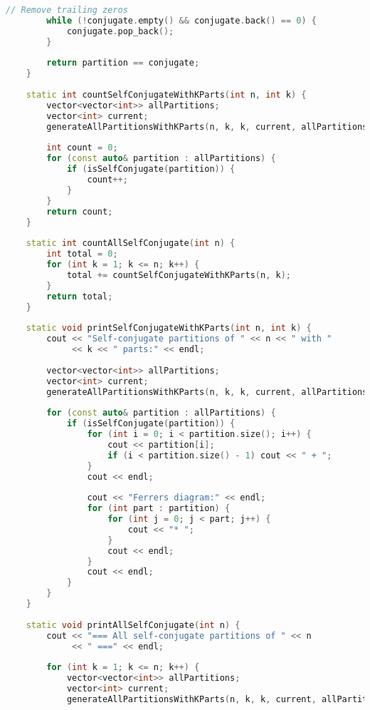 \documentclass[12pt,a4paper]{article}
\theoremstyle{definition}
\begin{document}
\begin{lstlisting}[language=C++, caption=Chương trình C++ hoàn chỉnh cho bài 2 \& 3]
        // Remove trailing zeros
        while (!conjugate.empty() && conjugate.back() == 0) {
            conjugate.pop_back();
        }
        
        return partition == conjugate;
    }
    
    static int countSelfConjugateWithKParts(int n, int k) {
        vector<vector<int>> allPartitions;
        vector<int> current;
        generateAllPartitionsWithKParts(n, k, k, current, allPartitions);
        
        int count = 0;
        for (const auto& partition : allPartitions) {
            if (isSelfConjugate(partition)) {
                count++;
            }
        }
        return count;
    }
    
    static int countAllSelfConjugate(int n) {
        int total = 0;
        for (int k = 1; k <= n; k++) {
            total += countSelfConjugateWithKParts(n, k);
        }
        return total;
    }
    
    static void printSelfConjugateWithKParts(int n, int k) {
        cout << "Self-conjugate partitions of " << n << " with " 
             << k << " parts:" << endl;
        
        vector<vector<int>> allPartitions;
        vector<int> current;
        generateAllPartitionsWithKParts(n, k, k, current, allPartitions);
        
        for (const auto& partition : allPartitions) {
            if (isSelfConjugate(partition)) {
                for (int i = 0; i < partition.size(); i++) {
                    cout << partition[i];
                    if (i < partition.size() - 1) cout << " + ";
                }
                cout << endl;
                
                cout << "Ferrers diagram:" << endl;
                for (int part : partition) {
                    for (int j = 0; j < part; j++) {
                        cout << "* ";
                    }
                    cout << endl;
                }
                cout << endl;
            }
        }
    }
    
    static void printAllSelfConjugate(int n) {
        cout << "=== All self-conjugate partitions of " << n 
             << " ===" << endl;
        
        for (int k = 1; k <= n; k++) {
            vector<vector<int>> allPartitions;
            vector<int> current;
            generateAllPartitionsWithKParts(n, k, k, current, allPartitions);
            

\end{lstlisting}
\end{document}
